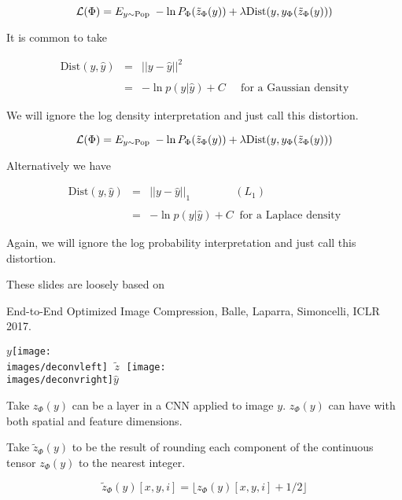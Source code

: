 {$${\cal L}(\Phi) = E_{y \sim \mathrm{Pop}}\;-\ln P_\Phi(\tilde{z}_\Phi(y)) + \lambda \mathrm{Dist}(y,y_\Phi(\tilde{z}_\Phi(y)))$$

\vfill
It is common to take

\begin{eqnarray*}
\mathrm{Dist}(y,\hat{y}) & = & ||y-\hat{y}||^2 \\
\\
& = & -\ln p(y|\hat{y}) + C \;\;\;\;\;\mbox{for a Gaussian density}
\end{eqnarray*}

\vfill
We will ignore the log density interpretation and just call this distortion.


$${\cal L}(\Phi) = E_{y \sim \mathrm{Pop}}\;-\ln P_\Phi(\tilde{z}_\Phi(y)) + \lambda \mathrm{Dist}(y,y_\Phi(\tilde{z}_\Phi(y)))$$

Alternatively we have

\begin{eqnarray*}
\mathrm{Dist}(y,\hat{y}) & = & ||y-\hat{y}||_1 \hspace{4em}(L_1) \\
\\
& = & -\ln p(y|\hat{y}) + C \;\;\mbox{for a Laplace density}
\end{eqnarray*}

\vfill
Again, we will ignore the log probability interpretation and just call this distortion.

These slides are loosely based on

\vfill
End-to-End Optimized Image Compression, Balle, Laparra, Simoncelli, ICLR 2017.


\vfill
\centerline{$y$\texttt{[image: \\images/deconvleft]} $\;\tilde{z}\;$ \texttt{[image: \\images/deconvright]}$\hat{y}$}



Take $z_\Phi(y)$ can be a layer in a CNN applied to image $y$.  $z_\Phi(y)$ can have with both spatial and feature dimensions.

\vfill
Take $\tilde{z}_\Phi(y)$ to be the result of rounding each component of the continuous tensor $z_\Phi(y)$ to the nearest integer.

\vfill
$$\tilde{z}_\Phi(y)[x,y,i] = \lfloor z_\Phi(y)[x,y,i] + 1/2 \rfloor$$


}
